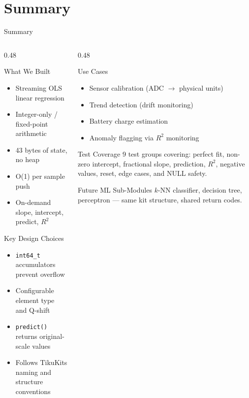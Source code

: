 \documentclass[aspectratio=169, 10pt]{beamer}
\begin{document}
\section{Summary}

\begin{frame}{Summary}
\begin{columns}[T]
\begin{column}{0.48\textwidth}
\begin{block}{What We Built}
\begin{itemize}
  \item Streaming OLS linear regression
  \item Integer-only / fixed-point arithmetic
  \item 43 bytes of state, no heap
  \item O(1) per sample push
  \item On-demand slope, intercept, predict, $R^2$
\end{itemize}
\end{block}

\begin{block}{Key Design Choices}
\begin{itemize}
  \item \texttt{int64\_t} accumulators prevent overflow
  \item Configurable element type and Q-shift
  \item \texttt{predict()} returns original-scale values
  \item Follows TikuKits naming and structure conventions
\end{itemize}
\end{block}
\end{column}

\begin{column}{0.48\textwidth}
\begin{block}{Use Cases}
\begin{itemize}
  \item Sensor calibration (ADC $\rightarrow$ physical units)
  \item Trend detection (drift monitoring)
  \item Battery charge estimation
  \item Anomaly flagging via $R^2$ monitoring
\end{itemize}
\end{block}

\begin{block}{Test Coverage}
9 test groups covering: perfect fit, non-zero intercept,
fractional slope, prediction, $R^2$, negative values,
reset, edge cases, and NULL safety.
\end{block}

\begin{block}{Future ML Sub-Modules}
$k$-NN classifier, decision tree, perceptron ---
same kit structure, shared return codes.
\end{block}
\end{column}
\end{columns}
\end{frame}
\end{document}
